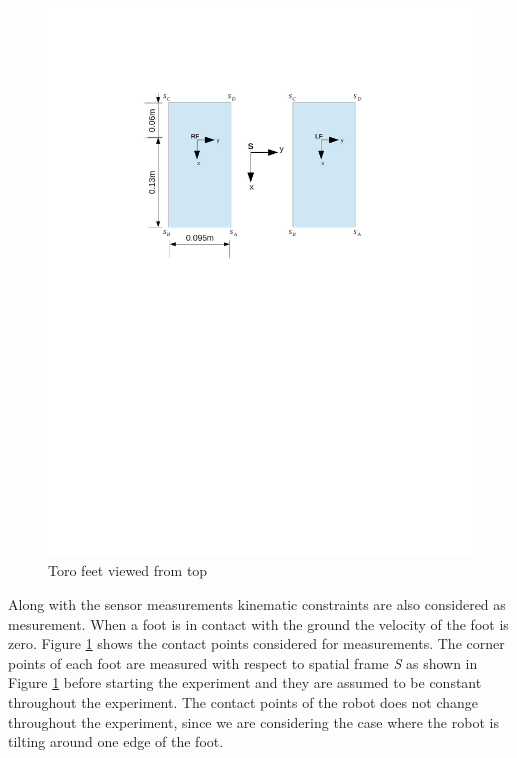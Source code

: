 \begin{enumerate}
\begin{itemize}
\end{itemize}
\begin{figure}
    \begin{center}
    \includegraphics[trim= 20mm 150mm 20mm 50mm,scale=0.80]{Bilder/foot_topview.pdf}
    \caption{Toro feet viewed from top}
    \label{fig:biped_feet}
    \end{center}
\end{figure}
Along with the sensor measurements kinematic constraints are also considered as mesurement. When a foot is in contact with the ground the velocity of the foot is zero. Figure \ref{fig:biped_feet} shows the contact points considered for measurements. The corner points of each foot are measured with respect to spatial frame \emph{S} as shown in Figure \ref{fig:biped_feet} before starting the experiment and they are assumed to be constant throughout the experiment. The contact points of the robot does not change throughout the experiment, since we are considering the case where the robot is tilting around one edge of the foot. 

\end{enumerate}
